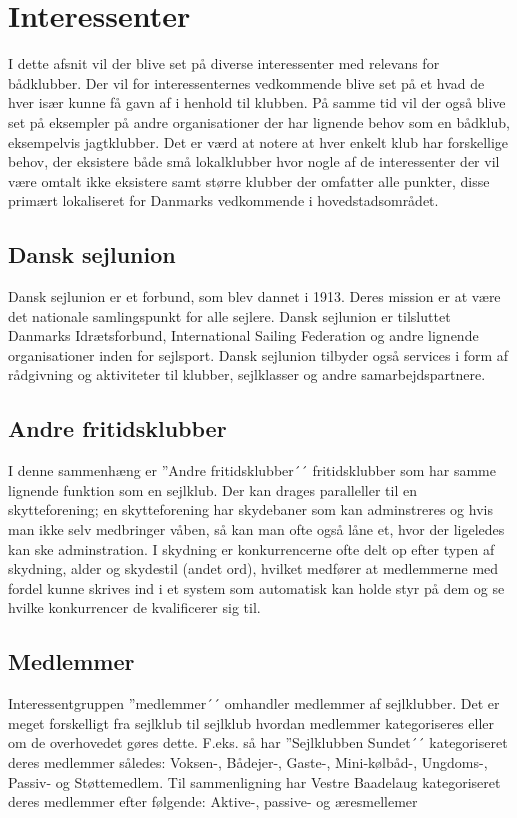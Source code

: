 \chapter{Interessenter}
I dette afsnit vil der blive set på diverse interessenter med relevans for bådklubber. Der vil for interessenternes vedkommende blive set på et hvad de hver især kunne få gavn af i henhold til klubben. På samme tid vil der også blive set på eksempler på andre organisationer der har lignende behov som en bådklub, eksempelvis jagtklubber. Det er værd at notere at hver enkelt klub har forskellige behov, der eksistere både små lokalklubber hvor nogle af de interessenter der vil være omtalt ikke eksistere samt større klubber der omfatter alle punkter, disse primært lokaliseret for Danmarks vedkommende i hovedstadsområdet.

\section{Dansk sejlunion}
Dansk sejlunion er et forbund, som blev dannet i 1913. 
Deres mission er at være det nationale samlingspunkt for alle sejlere. Dansk sejlunion er tilsluttet Danmarks Idrætsforbund, International Sailing Federation og andre lignende organisationer inden for sejlsport. 
Dansk sejlunion tilbyder også services i form af rådgivning og aktiviteter til klubber, sejlklasser og andre samarbejdspartnere.

\section{Andre fritidsklubber}
I denne sammenhæng er ''Andre fritidsklubber´´ fritidsklubber som har samme lignende funktion som en sejlklub. Der kan drages paralleller til en skytteforening; en skytteforening har skydebaner som kan adminstreres og hvis man ikke selv medbringer våben, så kan man ofte også låne et, hvor der ligeledes kan ske adminstration. I skydning er konkurrencerne ofte delt op efter typen af skydning, alder og skydestil (andet ord), hvilket medfører at medlemmerne med fordel kunne skrives ind i et system som automatisk kan holde styr på dem og se hvilke konkurrencer de kvalificerer sig til.

\section{Medlemmer}
Interessentgruppen ''medlemmer´´ omhandler medlemmer af sejlklubber. Det er meget forskelligt fra sejlklub til sejlklub hvordan medlemmer kategoriseres eller om de overhovedet gøres dette. F.eks. så har ''Sejlklubben Sundet´´ kategoriseret deres medlemmer således: Voksen-, Bådejer-, Gaste-, Mini-kølbåd-, Ungdoms-, Passiv- og Støttemedlem.
Til sammenligning har Vestre Baadelaug kategoriseret deres medlemmer efter følgende: Aktive-, passive- og æresmellemer

